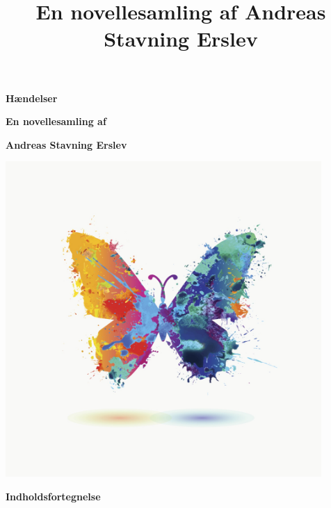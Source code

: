 \documentclass[]{article}
\title{En novellesamling \newline af Andreas Stavning Erslev}
\begin{document}
	
\begin{center}
	\huge\textbf{Hændelser}
\end{center}

\begin{center}
	\Large\textbf{En novellesamling af}
\end{center}

\begin{center}
	\LARGE\textbf{Andreas Stavning Erslev}
\end{center}

\includegraphics[width=0.9\textwidth]{sommerfugl}

\newpage

\begin{center}
	\LARGE\textbf{Indholdsfortegnelse}
\end{center}
\end{document}

